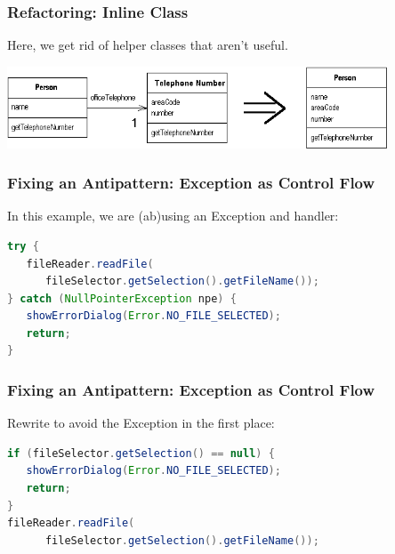 \begin{frame}
\frametitle{Refactoring: Inline Class}
\begin{changemargin}{1cm}

Here, we get rid of helper classes that aren't useful.

\begin{center}
\includegraphics[width=0.85\textwidth]{images/inlineClass.png}
\end{center}




\end{changemargin}
\end{frame}

\begin{frame}[fragile]
\frametitle{Fixing an Antipattern: Exception as Control Flow}
\begin{changemargin}{1cm}

In this example, we are (ab)using an Exception and handler:

\begin{lstlisting}[language={Java}]
try {
   fileReader.readFile(
      fileSelector.getSelection().getFileName());
} catch (NullPointerException npe) {
   showErrorDialog(Error.NO_FILE_SELECTED);
   return;
}
\end{lstlisting} 
\end{changemargin}
\end{frame}

\begin{frame}[fragile]
\frametitle{Fixing an Antipattern: Exception as Control Flow}
\begin{changemargin}{1cm}

Rewrite to avoid the Exception in the first place:

\begin{lstlisting}[language={Java}]
if (fileSelector.getSelection() == null) {
   showErrorDialog(Error.NO_FILE_SELECTED);
   return;
}
fileReader.readFile(
      fileSelector.getSelection().getFileName());
\end{lstlisting} 
\end{changemargin}
\end{frame}

